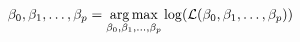 \documentclass[preview]{standalone}
\begin{document}
\begin{align*}
\special{dvisvgm:raw <g id='unique000'>}\beta_0, \beta_1, \dots, \beta_p=\underset{\beta_0, \beta_1, \dots, \beta_p}{\arg\max}\log(\mathcal{L}(\beta_0, \beta_1, \dots, \beta_p))\special{dvisvgm:raw </g>}
\end{align*}
\end{document}

